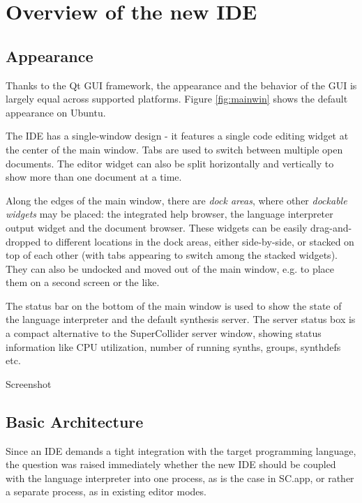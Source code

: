 \documentclass[11pt,a4paper]{article}
\begin{document}
\section{Overview of the new IDE}

\subsection{Appearance}

Thanks to the Qt GUI framework, the appearance and the behavior of the GUI is largely equal across supported platforms.
Figure \ref{fig:mainwin} shows the default appearance on Ubuntu.

The IDE has a single-window design - it features a single code editing widget at the center of the main window. Tabs are
used to switch between multiple open documents. The editor widget can also be split horizontally and vertically to show
more than one document at a time.

Along the edges of the main window, there are \emph{dock areas}, where other \emph{dockable widgets} may be placed: the
integrated help browser, the language interpreter output widget and the document browser. These widgets can be easily
drag-and-dropped to different locations in the dock areas, either side-by-side, or stacked on top of each other (with
tabs appearing to switch among the stacked widgets). They can also be undocked and moved out of the main window, e.g. to
place them on a second screen or the like.

The status bar on the bottom of the main window is used to show the state of the language interpreter and the default
synthesis server. The server status box is a compact alternative to the SuperCollider server window, showing status
information like CPU utilization, number of running synths, groups, synthdefs etc.

\begin{figure*}[]
  \centering
  \label{fig:mainwin}
  Screenshot
  \caption{The SuperCollider IDE running on Ubuntu}
\end{figure*}

\subsection{Basic Architecture}

Since an IDE demands a tight integration with the target programming language, the question was
raised immediately whether the new IDE should be coupled with the language interpreter into one
process, as is the case in SC.app, or rather a separate process, as in existing editor modes.
\end{document}
